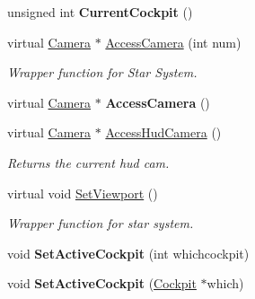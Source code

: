 \begin{DoxyCompactItemize}
\item 
unsigned int {\bfseries Current\+Cockpit} ()\hypertarget{classUniverse_abcb814a395c470ae31996285647a81be}{}\label{classUniverse_abcb814a395c470ae31996285647a81be}

\item 
virtual \hyperlink{classCamera}{Camera} $\ast$ \hyperlink{classUniverse_a04a32ac804354ce7074bd8db0efe5386}{Access\+Camera} (int num)\hypertarget{classUniverse_a04a32ac804354ce7074bd8db0efe5386}{}\label{classUniverse_a04a32ac804354ce7074bd8db0efe5386}

\begin{DoxyCompactList}\small\item\em Wrapper function for Star System. \end{DoxyCompactList}\item 
virtual \hyperlink{classCamera}{Camera} $\ast$ {\bfseries Access\+Camera} ()\hypertarget{classUniverse_ad1372dbc869494bdb62c1b3ebdef9ee1}{}\label{classUniverse_ad1372dbc869494bdb62c1b3ebdef9ee1}

\item 
virtual \hyperlink{classCamera}{Camera} $\ast$ \hyperlink{classUniverse_aaa62510660e9796e8287ddf0a34d7cb2}{Access\+Hud\+Camera} ()\hypertarget{classUniverse_aaa62510660e9796e8287ddf0a34d7cb2}{}\label{classUniverse_aaa62510660e9796e8287ddf0a34d7cb2}

\begin{DoxyCompactList}\small\item\em Returns the current hud cam. \end{DoxyCompactList}\item 
virtual void \hyperlink{classUniverse_ae9ca5fc07ad734348c6a28081a033b42}{Set\+Viewport} ()\hypertarget{classUniverse_ae9ca5fc07ad734348c6a28081a033b42}{}\label{classUniverse_ae9ca5fc07ad734348c6a28081a033b42}

\begin{DoxyCompactList}\small\item\em Wrapper function for star system. \end{DoxyCompactList}\item 
void {\bfseries Set\+Active\+Cockpit} (int whichcockpit)\hypertarget{classUniverse_a0bfcb34dd18a8115181d377dfd7f2056}{}\label{classUniverse_a0bfcb34dd18a8115181d377dfd7f2056}

\item 
void {\bfseries Set\+Active\+Cockpit} (\hyperlink{classCockpit}{Cockpit} $\ast$which)\hypertarget{classUniverse_ad7369cb0796b27cf10e157eef13c726b}{}\label{classUniverse_ad7369cb0796b27cf10e157eef13c726b}


\end{DoxyCompactItemize}
